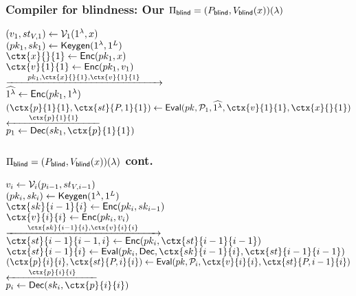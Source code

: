 \documentclass{beamer}
\begin{document}
\begin{frame}
	\frametitle{Compiler for blindness: Our $\Pi_{\mathsf{blind}}=(P_{\mathsf{blind}}, V_{\mathsf{blind}}(x))(\lambda)$}
	$(v_1, st_{V, 1})\leftarrow\mathcal{V}_1(1^\lambda, x)$
	\pause
	\\$(pk_1, sk_1)\leftarrow\mathsf{Keygen}(1^\lambda, 1^L)$
	\pause
	\\$\ctx{x}{}{1}\leftarrow\Enc(pk_1, x)$
	\pause
	\\$\ctx{v}{1}{1}\leftarrow\Enc(pk_1, v_1)$
	\pause
	\\\hspace*{\fill}$\xrightarrow{\qquad pk_1, \ctx{x}{}{1}, \ctx{v}{1}{1}\qquad}$\hspace*{\fill}
	\pause
	\\\hspace*{\fill}$\widehat{1^\lambda}\leftarrow\mathsf{Enc}(pk_1, 1^\lambda)$
	\pause
	\\\hspace*{\fill}$(\ctx{p}{1}{1}, \ctx{st}{P, 1}{1})\leftarrow\Eval(pk, \cP_1, \widehat{1^\lambda}, \ctx{v}{1}{1}, \ctx{x}{}{1})$
	\pause
	\\\hspace*{\fill}$\xleftarrow{\qquad \ctx{p}{1}{1}\qquad}$\hspace*{\fill}
	\pause
	\\$p_1\leftarrow\Dec(sk_1, \ctx{p}{1}{1})$
\end{frame}

\begin{frame}
	\frametitle{$\Pi_{\mathsf{blind}}=(P_{\mathsf{blind}}, V_{\mathsf{blind}}(x))(\lambda)$ cont.}
	$v_i\leftarrow\mathcal{V}_i(p_{i-1}, st_{V, i-1})$
	\pause
	\\$(pk_i, sk_i)\leftarrow\mathsf{Keygen}(1^\lambda, 1^L)$
	\pause
	\\$\ctx{sk}{i-1}{i}\leftarrow\Enc(pk_i, sk_{i-1})$
	\pause
	\\$\ctx{v}{i}{i}\leftarrow\Enc(pk_i, v_i)$
	\pause
	\\\hspace*{\fill}$\xrightarrow{\qquad \ctx{sk}{i-1}{i}, \ctx{v}{i}{i}\qquad}$\hspace*{\fill}
	\pause
	\\\hspace*{\fill}$\ctx{st}{i-1}{i-1, i}\leftarrow\Enc(pk_i, \ctx{st}{i-1}{i-1})$
	\pause
	\\\hspace*{\fill}$\ctx{st}{i-1}{i}\leftarrow\Eval(pk_i, \Dec, \ctx{sk}{i-1}{i}, \ctx{st}{i-1}{i-1})$
	\pause
	\\\hspace*{\fill}$(\ctx{p}{i}{i}, \ctx{st}{P, i}{i})\leftarrow\Eval(pk, \cP_i, \ctx{v}{i}{i}, \ctx{st}{P, i-1}{i})$
	\pause
	\\\hspace*{\fill}$\xleftarrow{\qquad \ctx{p}{i}{i}\qquad}$\hspace*{\fill}
	\pause
	\\$p_i\leftarrow\Dec(sk_i, \ctx{p}{i}{i})$
\end{frame}
\end{document}
